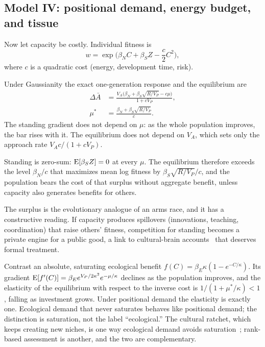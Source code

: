 \subsection{Model IV: positional demand, energy budget, and tissue}

Now let capacity be costly. Individual fitness is
\begin{equation}
w=\exp\!\Big(\beta_NC+\beta_SZ-\frac c2C^2\Big),\label{eq:cost}
\end{equation}
where $c$ is a quadratic cost (energy, development time, risk).

\begin{proposition}\label{prop:persist}
Under Gaussianity the exact one-generation response and the equilibrium are
\begin{align}
\Delta\bar A&=\frac{V_A\big(\beta_N+\beta_S\sqrt{R/V_P}-c\mu\big)}{1+cV_P},\label{eq:persist}\\
\mu^*&=\frac{\beta_N+\beta_S\sqrt{R/V_P}}{c}.\label{eq:mustar}
\end{align}
The standing gradient does not depend on $\mu$: as the whole population improves, the bar rises with it. The equilibrium
does not depend on $V_A$, which sets only the approach rate $V_Ac/(1+cV_P)$.
\end{proposition}

\begin{corollary}\label{cor:surplus}
Standing is zero-sum: $\operatorname{E}[\beta_SZ]=0$ at every $\mu$. The equilibrium therefore exceeds the level $\beta_N/c$ that maximizes
mean log fitness by $\beta_S\sqrt{R/V_P}/c$, and the population bears the cost of that surplus without aggregate benefit,
unless capacity also generates benefits for others.
\end{corollary}

The surplus is the evolutionary analogue of an arms race, and it has a constructive reading. If capacity produces spillovers
(innovations, teaching, coordination) that raise others' fitness, competition for standing becomes a private engine for a
public good, a link to cultural-brain accounts~\cite{muthukrishna2018} that deserves formal treatment.

Contrast an absolute, saturating ecological benefit $f(C)=\beta_E\kappa(1-e^{-C/\kappa})$. Its gradient
$\operatorname{E}[f'(C)]=\beta_Ee^{V_P/2\kappa^2}e^{-\mu/\kappa}$ declines as the population improves, and the elasticity of the equilibrium
with respect to the inverse cost is $1/(1+\mu^*/\kappa)<1$, falling as investment grows. Under positional demand the
elasticity is exactly one. Ecological demand that never saturates behaves like positional demand; the distinction is
saturation, not the label ``ecological.'' The cultural ratchet, which keeps creating new niches, is one way ecological
demand avoids saturation~\cite{muthukrishna2018}; rank-based assessment is another, and the two are complementary.

